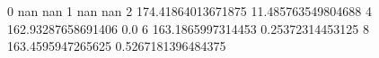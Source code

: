 0 nan nan
1 nan nan
2 174.41864013671875 11.485763549804688
4 162.93287658691406 0.0
6 163.1865997314453 0.25372314453125
8 163.4595947265625 0.5267181396484375
